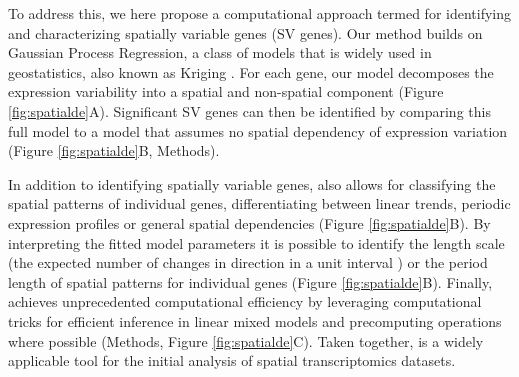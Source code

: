 To address this, we here propose a computational approach termed  for identifying and characterizing spatially variable genes (SV genes). Our method builds on Gaussian Process Regression, a class of models that is widely used in geostatistics, also known as Kriging \cite{Williams2006-kb}. For each gene, our model decomposes the expression variability into a spatial and non-spatial component (Figure \ref{fig:spatialde}A). Significant SV genes can then be identified by comparing this full model to a model that assumes no spatial dependency of expression variation (Figure \ref{fig:spatialde}B, Methods).

In addition to identifying spatially variable genes,  also allows for classifying the spatial patterns of individual genes, differentiating between linear trends, periodic expression profiles or general spatial dependencies (Figure \ref{fig:spatialde}B). By interpreting the fitted model parameters it is possible to identify the length scale (the expected number of changes in direction in a unit interval \cite{Williams2006-kb}) or the period length of spatial patterns for individual genes (Figure \ref{fig:spatialde}B). Finally,  achieves unprecedented computational efficiency by leveraging computational tricks for efficient inference in linear mixed models \cite{Lippert2011-fm} and precomputing operations where possible (Methods, Figure \ref{fig:spatialde}C). Taken together,  is a widely applicable tool for the initial analysis of spatial transcriptomics datasets.


